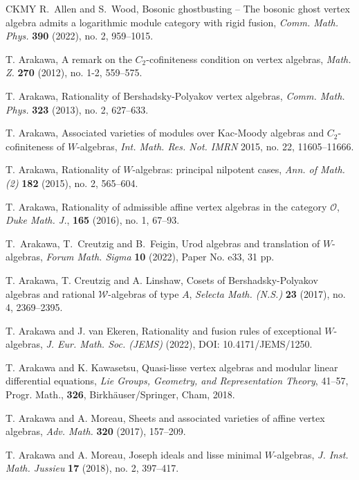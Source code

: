 \documentclass[11pt, reqno]{amsart}
\theoremstyle{definition}\newtheorem{defi}[thm]{Definition}
\theoremstyle{definition}\newtheorem{rem}[thm]{Remark}
\theoremstyle{definition}\newtheorem{exam}[thm]{Example}
\theoremstyle{definition}\newtheorem{assum}[thm]{Assumption}
\begin{document}
\begin{thebibliography}{CKMY}
R.~Allen and S.~Wood,
Bosonic ghostbusting -- The bosonic ghost vertex algebra admits a logarithmic module category with rigid fusion, \textit{Comm. Math. Phys.} \textbf{390} (2022), no. 2, 959--1015. 

T. Arakawa, A remark on the $C_2$-cofiniteness condition on vertex algebras, \textit{Math. Z.} \textbf{270} (2012), no. 1-2, 559--575. 

T. Arakawa, Rationality of Bershadsky-Polyakov vertex algebras, \textit{Comm. Math. Phys.} \textbf{323} (2013), no. 2, 627--633. 

T. Arakawa,  Associated varieties of modules over Kac-Moody algebras and $C_2$-cofiniteness of $W$-algebras, \textit{Int. Math. Res. Not. IMRN} 2015, no. 22, 11605--11666. 
 
T. Arakawa, Rationality of $W$-algebras: principal nilpotent cases, \textit{Ann. of Math. (2)} \textbf{182} (2015), no. 2, 565--604.

T. Arakawa, Rationality of admissible affine vertex algebras in the category $\mathcal{O}$, \textit{Duke Math. J.}, \textbf{165} (2016), no. 1, 67--93.

T.~Arakawa, T.~Creutzig and B.~Feigin, Urod algebras and translation of $W$-algebras, \textit{Forum Math. Sigma} \textbf{10} (2022), Paper No. e33, 31 pp.

 T. Arakawa, T. Creutzig and A. Linshaw,  Cosets of Bershadsky-Polyakov algebras and rational  $\mathcal{W}$-algebras of type $A$, \textit{Selecta Math. (N.S.)} \textbf{23} (2017), no. 4, 2369--2395.

T. Arakawa and J. van Ekeren, Rationality and fusion rules of exceptional $W$-algebras, \textit{J. Eur. Math. Soc. (JEMS)} (2022), DOI: 10.4171/JEMS/1250.

T. Arakawa and K. Kawasetsu, Quasi-lisse vertex algebras and modular linear differential equations, \textit{Lie Groups, Geometry, and Representation Theory}, 41--57, Progr. Math., \textbf{326}, Birkh\"{a}user/Springer, Cham, 2018. 

T. Arakawa and A. Moreau, Sheets and associated varieties of affine vertex algebras, \textit{Adv. Math.} \textbf{320} (2017), 157--209.

T. Arakawa and A. Moreau, Joseph ideals and lisse minimal $W$-algebras, \textit{J. Inst. Math. Jussieu} \textbf{17} (2018), no. 2, 397--417.


\end{thebibliography}
\end{document}
